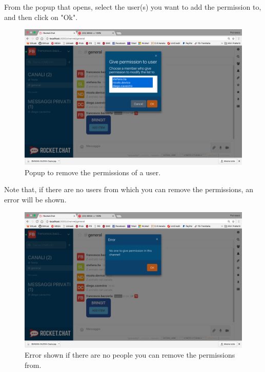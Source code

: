 From the popup that opens, select the user(s) you want to add the permission to, and then click on "Ok".

\begin{figure}[H]
  \centering 
  \includegraphics[width=\textwidth]{Sections/3-HowToUse/Images/popup_permission_give.png}
  \caption{Popup to remove the permissions of a user.}
\end{figure}

Note that, if there are no users from which you can remove the permissions, an error will be shown.

\begin{figure}[H]
  \centering 
  \includegraphics[width=\textwidth]{Sections/3-HowToUse/Images/popup_permission_give_error.png}
  \caption{Error shown if there are no people you can remove the permissions from.}
\end{figure}